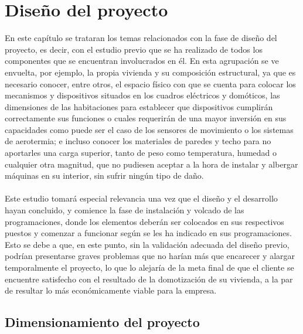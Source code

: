 \chapter{Diseño del proyecto}

En este capítulo se trataran los temas relacionados con la fase de diseño del proyecto, es decir, con el estudio previo que se ha realizado de todos los componentes que se encuentran involucrados en él. En esta agrupación se ve envuelta, por ejemplo, la propia vivienda y su composición estructural, ya que es necesario conocer, entre otros, el espacio físico con que se cuenta para colocar los mecanismos y dispositivos situados en los cuadros eléctricos y domóticos, las dimensiones de las habitaciones para establecer que dispositivos cumplirán correctamente sus funciones o cuales requerirán de una mayor inversión en sus capacidades como puede ser el caso de los sensores de movimiento o los sistemas de aerotermia; e incluso conocer los materiales de paredes y techo para no aportarles una carga superior, tanto de peso como temperatura, humedad o cualquier otra magnitud, que no pudiesen aceptar a la hora de instalar y albergar máquinas en su interior, sin sufrir ningún tipo de daño.\\\\
Este estudio tomará especial relevancia una vez que el diseño y el desarrollo hayan concluido, y comience la fase de instalación y volcado de las programaciones, donde los elementos deberán ser colocados en sus respectivos puestos y comenzar a funcionar según se les ha indicado en sus programaciones. Esto se debe a que, en este punto, sin la validación adecuada del diseño previo, podrían presentarse graves problemas que no harían más que encarecer y alargar temporalmente el proyecto, lo que lo alejaría de la meta final de que el cliente se encuentre satisfecho con el resultado de la domotización de su vivienda, a la par de resultar lo más económicamente viable para la empresa.


\section{Dimensionamiento del proyecto}

